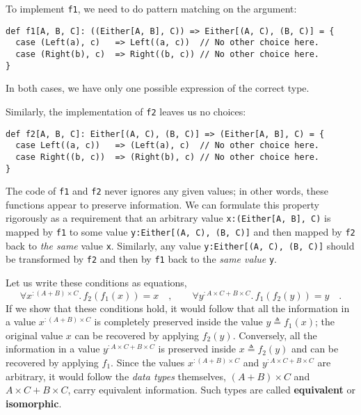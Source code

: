 To implement \lstinline!f1!,
we need to do pattern matching on the argument:
\begin{lstlisting}
def f1[A, B, C]: ((Either[A, B], C)) => Either[(A, C), (B, C)] = {
  case (Left(a), c)   => Left((a, c))  // No other choice here.
  case (Right(b), c)  => Right((b, c)) // No other choice here.
}
\end{lstlisting}
In both cases, we have only one possible expression of the correct
type.

Similarly, the implementation of \lstinline!f2!
leaves us no choices:
\begin{lstlisting}
def f2[A, B, C]: Either[(A, C), (B, C)] => (Either[A, B], C) = {
  case Left((a, c))   => (Left(a), c)  // No other choice here.
  case Right((b, c))  => (Right(b), c) // No other choice here.
}
\end{lstlisting}
The code of \lstinline!f1!
and \lstinline!f2! never
ignores any given values; in other words, these functions appear to
preserve information. We can formulate this property rigorously as
a requirement that an arbitrary value \lstinline!x:(Either[A, B], C)!
is mapped by \lstinline!f1!
to some value \lstinline!y:Either[(A, C), (B, C)]!
and then mapped by \lstinline!f2!
back to \emph{the same} value \lstinline!x!.
Similarly, any value \lstinline!y:Either[(A, C), (B, C)]!
should be transformed by \lstinline!f2!
and then by \lstinline!f1!
back to the \emph{same value} \lstinline!y!. 

Let us write these conditions as equations,
\[
\forall x^{:(A+B)\times C}.\,f_{2}(f_{1}(x))=x\quad,\quad\quad\forall y^{:A\times C+B\times C}.\,f_{1}\left(f_{2}(y)\right)=y\quad.
\]
If we show that these conditions hold, it would follow that all the
information in a value $x^{:(A+B)\times C}$ is completely preserved
inside the value $y\triangleq f_{1}(x)$; the original value $x$
can be recovered by applying $f_{2}(y)$. Conversely, all the information
in a value $y^{:A\times C+B\times C}$ is preserved inside $x\triangleq f_{2}(y)$
and can be recovered by applying $f_{1}$. Since the values $x^{:(A+B)\times C}$
and $y^{:A\times C+B\times C}$ are arbitrary, it would follow the
\emph{data types} themselves, $\left(A+B\right)\times C$ and $A\times C+B\times C$,
carry equivalent information. Such types are called \textbf{equivalent}
or \textbf{isomorphic}.

